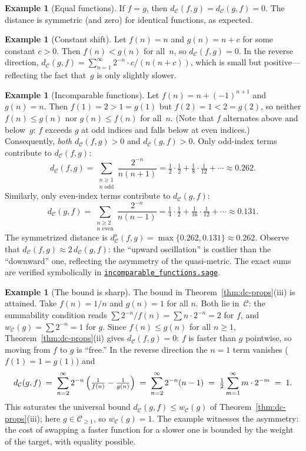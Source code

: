 \documentclass[11pt,a4paper]{article}
\newcommand{\repourl}{https://github.com/gabayae/expansive-homeomorphisms-complexity-qmetric}
\theoremstyle{plain}
\theoremstyle{definition}
\newtheorem{exampleinner}[theoreminner]{Example}
\newenvironment{example}[1][]{\begin{exampleinner}[#1]}{\end{exampleinner}}
\newcommand{\C}{\mathcal{C}}
\begin{document}
\begin{example}[Equal functions]\label{ex:equal}
If $f=g$, then $d_\C(f,g)=d_\C(g,f)=0$.  The distance is
symmetric (and zero) for identical functions, as expected.
\end{example}

\begin{example}[Constant shift]\label{ex:constant-shift}
Let $f(n)=n$ and $g(n)=n+c$ for some constant $c>0$.  Then
$f(n)<g(n)$ for all~$n$, so $d_\C(f,g)=0$.  In the reverse
direction, $d_\C(g,f)=\sum_{n=1}^\infty 2^{-n}\cdot c/(n(n+c))$,
which is small but positive---reflecting the fact that~$g$ is only
slightly slower.
\end{example}


\begin{example}[Incomparable functions]\label{ex:incomparable}
Let $f(n)=n+(-1)^{n+1}$ and $g(n)=n$.  Then $f(1)=2>1=g(1)$ but
$f(2)=1<2=g(2)$, so neither $f(n)\le g(n)$ nor $g(n)\le f(n)$
for all~$n$.  (Note that $f$ alternates above and below~$g$: $f$
exceeds $g$ at odd indices and falls below at even indices.)
Consequently, \emph{both} $d_\C(f,g)>0$ and $d_\C(g,f)>0$.
Only odd-index terms contribute to $d_\C(f,g)$:
\[
  d_\C(f,g) = \sum_{\substack{n\ge 1\\n\text{ odd}}}
  \frac{2^{-n}}{n(n+1)}
  = \tfrac{1}{2}\cdot\tfrac{1}{2}
    +\tfrac{1}{8}\cdot\tfrac{1}{12}+\cdots
  \approx 0.262.
\]
Similarly, only even-index terms contribute to $d_\C(g,f)$:
\[
  d_\C(g,f) = \sum_{\substack{n\ge 2\\n\text{ even}}}
  \frac{2^{-n}}{n(n-1)}
  = \tfrac{1}{4}\cdot\tfrac{1}{2}
    +\tfrac{1}{16}\cdot\tfrac{1}{12}+\cdots
  \approx 0.131.
\]
The symmetrized distance is
$d_\C^s(f,g)=\max\{0.262,0.131\}\approx 0.262$.
Observe that $d_\C(f,g)\approx 2\,d_\C(g,f)$: the
``upward oscillation'' is costlier than the ``downward'' one,
reflecting the asymmetry of the quasi-metric.
The exact sums are verified symbolically in
\href{\repourl/blob/main/code/sagemath/incomparable_functions.sage}{\texttt{incomparable\_functions.sage}}.
\end{example}

\begin{example}[The bound is sharp]\label{ex:counter-bounded}
The bound in Theorem~\ref{thm:dc-props}(iii) is attained.  Take
$f(n)=1/n$ and $g(n)=1$ for all $n$.  Both lie in~$\C$: the
summability condition reads $\sum 2^{-n}/f(n)=\sum n\cdot 2^{-n}=2$
for $f$, and $w_\C(g)=\sum 2^{-n}=1$ for $g$.  Since
$f(n)\le g(n)$ for all $n\ge 1$, Theorem~\ref{thm:dc-props}(ii)
gives $d_\C(f,g)=0$: $f$ is faster than $g$ pointwise, so moving
from $f$ to $g$ is ``free.''  In the reverse direction the $n=1$ term vanishes
($f(1)=1=g(1)$) and
\[
  d_\C(g,f)
  \;=\; \sum_{n=2}^\infty 2^{-n}\,\Bigl(\tfrac{1}{f(n)}-\tfrac{1}{g(n)}\Bigr)
  \;=\; \sum_{n=2}^\infty 2^{-n}(n-1)
  \;=\; \tfrac{1}{2}\sum_{m=1}^\infty m\cdot 2^{-m}
  \;=\; 1.
\]
This saturates the universal bound $d_\C(g,f)\le w_\C(g)$ of
Theorem~\ref{thm:dc-props}(iii); here $g\in\C_{\ge 1}$, so
$w_\C(g)=1$.  The example witnesses the asymmetry: the cost of
swapping a faster function for a slower one is bounded by the
weight of the target, with equality possible.
\end{example}
\end{document}
